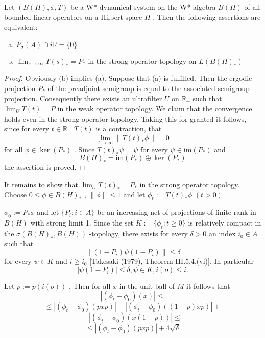 \begin{proposition}\label{prop:d4-3.7}
Let $ (B(H),\phi,T) $  be a W*-dynamical system on the W*-algebra $ B(H) $  of all bounded linear operators on a Hilbert space $ H $ .
Then the following assertions are equivalent:
\begin{enumerate}[(a)]
\item
$ P_{\sigma}(A) \cap i\mathbb{R} = \{0\} $ 

\item
$ \lim_{s \to \infty} T(s)_{*} = P_{*} $  in the strong operator topology on $ L(B(H)_{*}) $ 
\end{enumerate}
\end{proposition}

\begin{proof}
Obviously (b) implies (a).
Suppose that (a) is fulfilled.
Then the ergodic projection $ P_{*} $  of the preadjoint semigroup is equal to the associated semigroup projection.
Consequently there exists an ultrafilter $ U $  on $ \mathbb{R}_{+} $  such that $ \lim_{U} T(t) = P $  in the weak operator topology.
We claim that the convergence holds even in the strong operator topology.
Taking this for granted it follows, since for every $ t \in \mathbb{R}_{+} $  $ T(t) $  is a contraction, that
\[
\lim_{t \to \infty} \|T(t)_{*}\phi\| = 0
\]
for all $ \phi \in \ker(P_{*}) $ .
Since $ T(t)_{*}\psi = \psi $  for every $ \psi \in \text{im}(P_{*}) $  and
\[
B(H)_{*} = \text{im}(P_{*}) \oplus \ker(P_{*})
\]
the assertion is proved.
\end{proof}


It remains to show that $ \lim_{U} T(t)_{*} = P_{*} $  in the strong operator topology.
Choose $ 0 \leq \phi \in B(H)_{*} $ , $ \|\phi\| \leq 1 $  and let $ \phi_{t} := T(t)_{*}\phi $  $ (t>0) $ .

\newpage

$ \phi_{0} := P_{*}\phi $  and let $ \{P_{i}: i \in A\} $  be an increasing net of projections of finite rank in $ B(H) $  with strong limit 1.
Since the set $ K := \{\phi_{t}: t \geq 0\} $  is relatively compact in the $ \sigma(B(H)_{*},B(H)) $ -topology, there exists for every $ \delta > 0 $  an index $ i_{0} \in A $  such that
\[
\|(1 - P_{i})\psi(1 - P_{i})\| \leq \delta
\]
for every $ \psi \in K $  and $ i \geq i_{0} $  [Takesaki (1979), Theorem III.5.4.(vi)].
In particular
\[
|\psi(1 - P_{i})| \leq \delta, \psi \in K, i(o) \leq i.
\]

Let $ p := p(i(o)) $ .
Then for all $ x $  in the unit ball of $ M $  it follows that
\[
|(\phi_{t} - \phi_{0})(x)| \leq
\]
\[
\leq |(\phi_{t} - \phi_{0})(pxp)| + |(\phi_{t} - \phi_{0})((1-p)xp)| +
\]
\[
+ |(\phi_{t} - \phi_{0})(x(1-p))| \leq
\]
\[
\leq |(\phi_{t} - \phi_{0})(pxp)| + 4\sqrt{\delta}
\]

